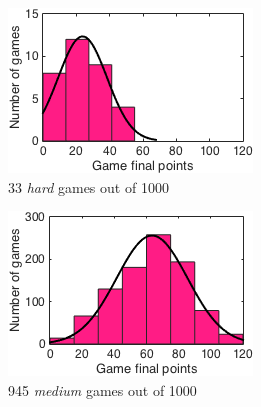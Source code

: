 \begin{figure}[h]
        \centering
        \begin{subfigure}[h]{0.32\textwidth}
                \includegraphics[width=\textwidth]{./img/appendix/histFhard}
                \caption{33 \emph{hard} games out of 1000}
                \label{app:histFhard}
        \end{subfigure}
        \begin{subfigure}[h]{0.32\textwidth}
                \includegraphics[width=\textwidth]{./img/appendix/histFmedium}
                \caption{945 \emph{medium} games out of 1000}
                \label{app:histFmedium}
        \end{subfigure}
        \begin{subfigure}[h]{0.32\textwidth}

\end{subfigure}
\end{figure}
